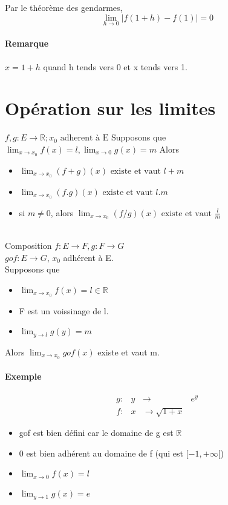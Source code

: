 Par le théorème des gendarmes, \[\lim_{h \to 0} |f(1+h)-f(1)| =0\]

\paragraph{Remarque} $x = 1+h$ quand h tends vers 0 et x tends vers 1.

\section{Opération sur les limites}

$f, g : E \rightarrow \mathbb{R}; x_0 \text{ adherent à E}$
Supposons que $\lim_{x \to x_0} f(x) = l, \lim_{x \to 0} g(x) = m$ Alors 
\begin{itemize}
	\item $\lim_{x \to x_0} (f+g)(x) \text{ existe et vaut } l+m$
	\item $\lim_{x \to x_0} (f.g)(x) \text{ existe et vaut } l.m $
	\item si $m \neq 0$, alors $\lim_{x \to x_0} (f/g)(x) \text{ existe et vaut } \frac{l}{m}$
\end{itemize}

~\\
Composition $f:E \rightarrow F, g:F \rightarrow G$
~\\
$gof : E \rightarrow G$, $x_0$ adhérent à E.
~\\

Supposons que \begin{itemize}
	\item $\lim_{x \to x_0} f(x) = l \in \mathbb{R}$
	\item F est un voissinage de l.
	\item $\lim_{y \to l} g(y) = m$
\end{itemize}

Alors $\lim_{x \to x_0} gof(x)$ existe et vaut m.

\paragraph{Exemple} \[\begin{array}{rccl}
	g:& y&\rightarrow & e^y \\
	f:& x&\rightarrow \sqrt{1+x}
\end{array}\]

\begin{itemize}
	\item gof est bien défini car le domaine de g est $\mathbb{R}$
	\item 0 est bien adhérent  au domaine de f (qui est $[-1, +\infty[$)
	\item $\lim_{x \to 0} f(x) = l$
	\item $\lim_{y \to 1} g(x) = e$
\end{itemize}

